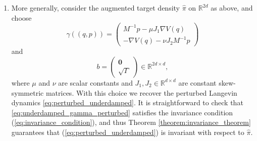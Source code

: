 \begin{enumerate}
  \item More generally, consider the augmented target density $\widehat{\pi}$ on $\mathbb{R}^{2d}$ as above, and choose 
  \begin{equation}
  \label{eq:underdamped_gamma_perturbed}
    \gamma((q,p)) = \left(\begin{array}{c} M^{-1}p - \mu J_1\nabla V(q) \\ -\nabla V(q) - \nu J_2 M^{-1}p\end{array}\right)
  \end{equation}
  and 
  \begin{equation}
    \label{eq:underdamped_sigma_pertured}
    b = \left(\begin{array}{c}\boldsymbol{0} \\ \sqrt{\Gamma}\end{array}\right) \in \mathbb{R}^{2d \times d},
  \end{equation}
  where $\mu$ and $\nu$ are scalar constants and $J_1, J_2 \in \mathbb{R}^{d\times d}$ are constant skew-symmetric matrices.  With this choice we recover the perturbed Langevin dynamics \eqref{eq:perturbed_underdamped}.  It is straightforward to check that \eqref{eq:underdamped_gamma_perturbed}  satisfies the invariance condition (\ref{eq:invariance_condition}), and thus Theorem \ref{theorem:invariance_theorem} guarantees that (\ref{eq:perturbed_underdamped}) is invariant with respect to $\widehat{\pi}$. 


\end{enumerate}
